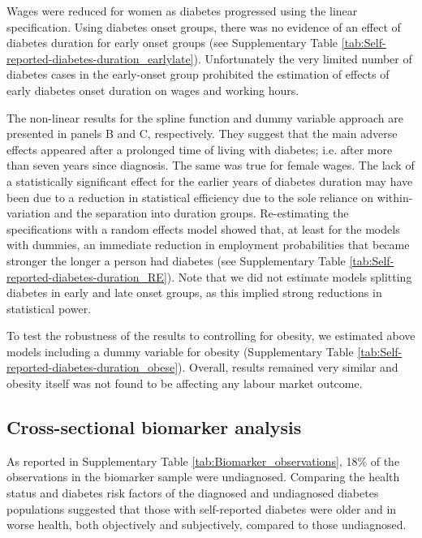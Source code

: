 \documentclass[12pt,english]{article}
\begin{document}
Wages were reduced for women as diabetes progressed using the linear specification. Using diabetes onset groups, there was no evidence of an effect of diabetes duration for early onset groups (see Supplementary Table \ref{tab:Self-reported-diabetes-duration_earlylate}). Unfortunately the very limited number of diabetes cases in the early-onset group prohibited the estimation of effects of early diabetes onset duration on wages and working hours.


The non-linear results for the spline function and dummy variable approach are  presented in panels B and C, respectively. They suggest that the main adverse effects appeared after a prolonged time of living with diabetes; i.e. after more than seven years since diagnosis. The same was true for female wages. The lack of a statistically significant effect for the earlier years of diabetes duration may have been due to a reduction in statistical efficiency due to the sole reliance on within-variation and the separation into duration groups. Re-estimating the specifications with a random effects model showed that, at least for the models with dummies, an immediate reduction in employment probabilities that became stronger the longer a person had diabetes (see Supplementary Table \ref{tab:Self-reported-diabetes-duration_RE}). Note that we did not estimate models splitting diabetes in early and late onset groups, as this implied strong reductions in statistical power.

To test the robustness of the results to controlling for obesity, we estimated above models including a dummy variable for obesity (Supplementary Table \ref{tab:Self-reported-diabetes-duration_obese}). Overall, results remained very similar and obesity itself was not found to be affecting any labour market outcome.



\FloatBarrier

\subsection{Cross-sectional biomarker analysis}


As reported in Supplementary Table \ref{tab:Biomarker_observations}, 18\% of the observations in the biomarker sample were undiagnosed. Comparing the health status and diabetes risk factors of the diagnosed and undiagnosed diabetes populations suggested that those with self-reported diabetes were older and in worse health, both objectively and subjectively, compared to those undiagnosed.
\end{document}
